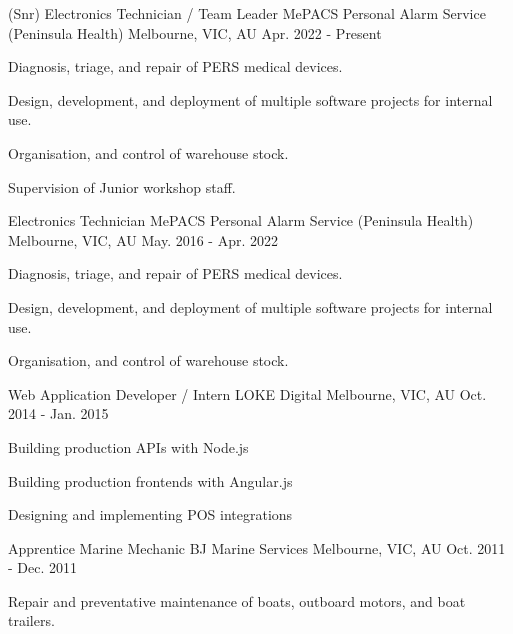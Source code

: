 

\begin{cventries}

  \cventry
    {(Snr) Electronics Technician / Team Leader} %
    {MePACS Personal Alarm Service (Peninsula Health)} %
    {Melbourne, VIC, AU} %
    {Apr. 2022 - Present} %
    {
      \begin{cvitems} %
        \item {Diagnosis, triage, and repair of PERS medical devices.}
        \item {Design, development, and deployment of multiple software projects for internal use.}
        \item {Organisation, and control of warehouse stock.}
        \item {Supervision of Junior workshop staff.}
      \end{cvitems}
    }
  \cventry
    {Electronics Technician} %
    {MePACS Personal Alarm Service (Peninsula Health)} %
    {Melbourne, VIC, AU} %
    {May. 2016 - Apr. 2022} %
    {
      \begin{cvitems} %
        \item {Diagnosis, triage, and repair of PERS medical devices.}
        \item {Design, development, and deployment of multiple software projects for internal use.}
        \item {Organisation, and control of warehouse stock.}
      \end{cvitems}
    }
  \cventry
    {Web Application Developer / Intern} %
    {LOKE Digital} %
    {Melbourne, VIC, AU} %
    {Oct. 2014 - Jan. 2015} %
    {
      \begin{cvitems} %
        \item {Building production APIs with Node.js}
        \item {Building production frontends with Angular.js}
        \item {Designing and implementing POS integrations}
      \end{cvitems}
    }
  \cventry
    {Apprentice Marine Mechanic}
    {BJ Marine Services}
    {Melbourne, VIC, AU}
    {Oct. 2011 - Dec. 2011}
    {
      \begin{cvitems}
        \item {Repair and preventative maintenance of  boats, outboard motors, and boat trailers.}
      \end{cvitems}
    }


\end{cventries}
